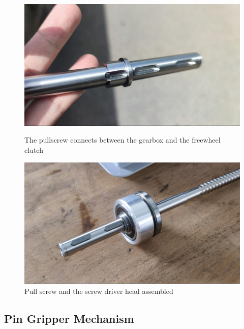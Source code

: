 \begin{figure}[!h]
    \centering
    \begin{minipage}{0.49\textwidth}
        \centering
        \includegraphics[width=\textwidth]{images/7a/img38.jpg}
        \caption{The pullscrew connects between the gearbox and the freewheel clutch}
        \label{fig:keyway-interface}
    \end{minipage}
    \hfill
    \begin{minipage}{0.49\textwidth}
        \centering
        \includegraphics[width=\textwidth]{images/7a/img39.jpg}
        \caption{Pull screw and the screw driver head assembled}
        \label{fig:pull-screw-head-assembled}
    \end{minipage}
\end{figure}

\FloatBarrier

\subsection{Pin Gripper Mechanism}
\label{subsection:exploration-4-pin-gripper-mechanism}


